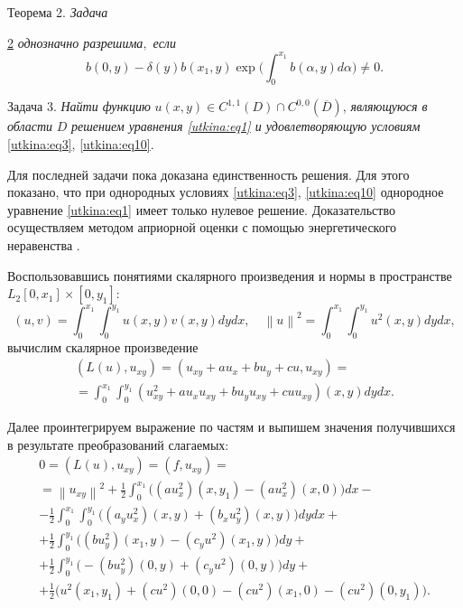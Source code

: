 {\small \sc Теорема 2.} \textit{Задача} {\hyperlink{utask2}{2} {\it однозначно разрешима$,$ если } 
$$b(0,y) - \delta (y)b(x_1 ,y)\exp \biggl(\int _0^{x_1 } b(\alpha ,y)d\alpha \biggr) \ne 0. 
$$


\smallskip



{\small\sc Задача 3.} \textit{Найти функцию} $u(x, y) \in C^{1,1}\left( D
\right) \cap C^{0, 0}\left( {\overline D } \right)$, \textit{являющуюся в области}  $D$ \textit{решением уравнения \eqref{utkina:eq1} и удовлетворяющую условиям} \eqref{utkina:eq3}, \eqref{utkina:eq10}.

\smallskip

Для последней задачи пока доказана единственность решения. 
Для этого показано, что при однородных условиях \eqref{utkina:eq3}, \eqref{utkina:eq10} однородное уравнение \eqref{utkina:eq1} имеет только нулевое решение. 
Доказательство осуществляем методом априорной оценки с помощью энергетического неравенства \cite{utkina:bib:Lad}.

Воспользовавшись понятиями скалярного произведения и нормы в
пространстве $L_2 \left[ {0,x_1 } \right]\times \left[ {0,y_1 }
\right]$: 
$$\left( {u,v} \right) = \int _0^{x_1 } {\int _0^{y_1 }
{u(x, y)v(x, y)dydx} } ,\quad 
\left\| u \right\|^2 = \int _0^{x_1 } {\int _0^{y_1 } {u^2(x, y)dydx} }
,$$ 
вычислим скалярное произведение
\begin{multline}
 \left( {L\left( u \right),u_{xy} } \right) = (u_{xy} + au_x + bu_y +
cu,u_{xy} ) = \\
 = \int _0^{x_1 } \int _0^{y_1 } (u_{xy}^2 + au_x u_{xy} + bu_y
u_{xy} + cuu_{xy} )(x, y)dydx. 
 \end{multline}




Далее проинтегрируем выражение по частям и выпишем значения получившихся в
результате преобразований слагаемых:
\begin{multline}
\label{utkina:eq11}
 0 = (L(u),u_{xy} ) = (f,u_{xy} ) = \\
 = \left\| {u_{xy} } \right\|^2 +
\frac{1}{2}\int _0^{x_1 } \bigl( (au_x^2 )(x,y_1 ) - (au_x^2 )(x, 0)\bigr) dx -
\\
 - \frac{1}{2}\int _0^{x_1 } \int _0^{y_1 } \bigl( 
 (a_y u_x^2 )(x,y)
+ (b_x u_y^2 )(x,y)\bigr)dydx + \\
 + \frac{1}{2}\int _0^{y_1 } \bigl((bu_y^2 )(x_1 ,y) - (c_y u^2)(x_1 ,y)\bigr)dy +\\
+ \frac{1}{2}\int _0^{y_1 } \bigl( - (bu_y^2 )(0,y) + (c_y u^2)(0,y)\bigr) dy +
\\
 + \frac{1}{2} \bigl(u^2(x_1 ,y_1 ) + (cu^2)(0, 0) - (cu^2)(x_1 , 0) - (cu^2)(0,y_1 ) \bigr). 
 \end{multline}


}
